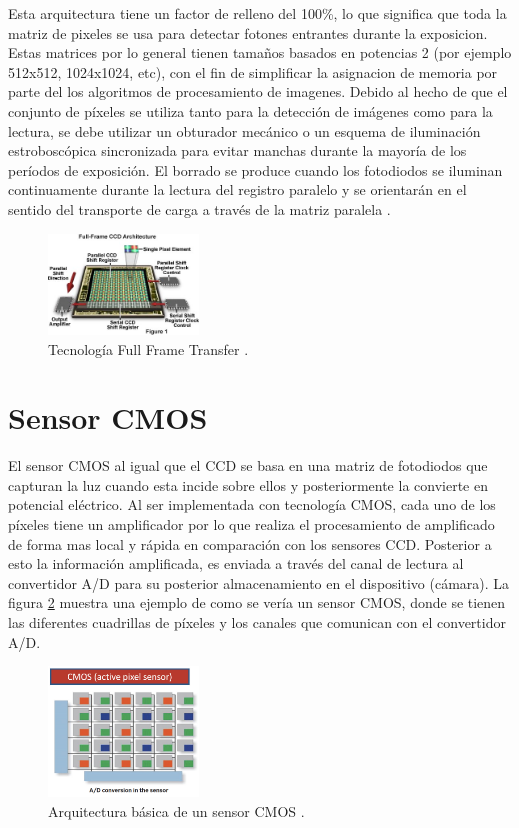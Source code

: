 \documentclass[conference]{IEEEtran}
\begin{document}
Esta arquitectura tiene un factor de relleno del 100\%, lo que significa que toda la matriz de pixeles se usa para detectar fotones entrantes durante la exposicion. Estas matrices por lo general tienen tama\~nos basados en potencias 2 (por ejemplo 512x512, 1024x1024, etc), con el fin de simplificar la asignacion de memoria por parte del los algoritmos de procesamiento de imagenes. Debido al hecho de que el conjunto de píxeles se utiliza tanto para la detección de imágenes como para la lectura, se debe utilizar un obturador mecánico o un esquema de iluminación estroboscópica sincronizada para evitar manchas durante la mayoría de los períodos de exposición. El borrado se produce cuando los fotodiodos se iluminan continuamente durante la lectura del registro paralelo y se orientarán en el sentido del transporte de carga a través de la matriz paralela \cite{fft_ccd}.


\begin{figure}[H]
\centering
\includegraphics[width=4cm]{fullframeccd}
\caption{Tecnología Full Frame Transfer \cite{fft_ccd}.}
\label{fft_ccd}
\end{figure}


\section{\textbf{Sensor CMOS}}

El sensor CMOS al igual que el CCD se basa en una matriz de fotodiodos que capturan la luz cuando esta incide sobre ellos y posteriormente la convierte en potencial eléctrico. Al ser implementada con tecnología CMOS, cada uno de los píxeles tiene un amplificador por lo que realiza el procesamiento de amplificado de forma mas local y rápida en comparación con los sensores CCD. Posterior a esto la información amplificada, es enviada a través del canal de lectura al convertidor A/D para su posterior almacenamiento en el dispositivo (cámara). La figura \ref{cmos_sensor} muestra una ejemplo de como se vería un sensor CMOS, donde se tienen las diferentes cuadrillas de píxeles y los canales que comunican con el convertidor A/D.

\begin{figure}[H]
\centering
\includegraphics[width=4cm]{cmos_sensor}
\caption{Arquitectura básica de un sensor CMOS \cite{cmos}.}
\label{cmos_sensor}
\end{figure}
\end{document}
